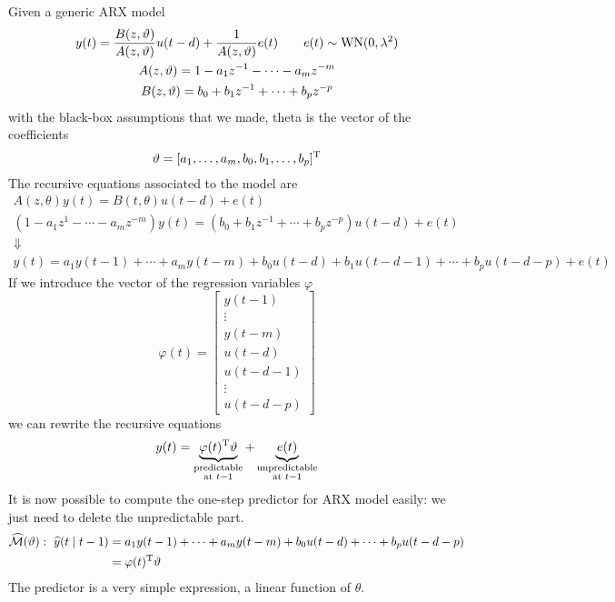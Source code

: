 Given a generic ARX model
\begin{gather*}
y(t) =\frac{B(z,\vartheta)}{A(z,\vartheta)} u(t-d) +\frac{1}{A(z,\vartheta)} e(t) \qquad e(t) \sim \operatorname{WN}(0,\lambda ^{2})\\
A(z,\vartheta) =1-a_{1} z^{-1} -\cdots -a_{m} z^{-m}\\
B(z,\vartheta) =b_{0} +b_{1} z^{-1} +\cdots +b_{p} z^{-p}
\end{gather*}
with the black-box assumptions that we made, theta is the vector of the coefficients
\begin{equation*}
\vartheta = [ a_{1},\ldots,a_{m},b_{0},b_{1},\ldots,b_{p}]^{\mathrm{T}}
\end{equation*}
The recursive equations associated to the model are
\begin{gather*}
A(z,\theta) y(t) =B(t,\theta) u(t-d) +e(t)\\
\left(1-a_{1} z^{1} -\cdots -a_{m} z^{-m}\right) y(t) =\left(b_{0} +b_{1} z^{-1} +\cdots +b_{p} z^{-p}\right) u(t-d) +e(t)\\
\Downarrow \\
y(t) =a_{1} y(t-1) +\cdots +a_{m} y(t-m) +b_{0} u(t-d) +b_{1} u(t-d-1) +\cdots +b_{p} u(t-d-p) +e(t)
\end{gather*}
If we introduce the vector of the regression variables $ \varphi $
\begin{equation*}
\varphi (t) =\begin{bmatrix}
y(t-1)\\
\vdots\\
y(t-m)\\
u(t-d)\\
u(t-d-1)\\
\vdots\\
u(t-d-p)
\end{bmatrix}
\end{equation*}
we can rewrite the recursive equations
\begin{equation*}
	y(t) =\underbrace{\varphi (t)^{\mathrm{T}} \vartheta }_{\substack{\text{predictable}\\\text{at }t-1}} +\underbrace{e(t)}_{\substack{\text{unpredictable}\\\text{at }t-1}}
\end{equation*}
It is now possible to compute the one-step predictor for ARX model easily: we just need to delete the unpredictable part.
\begin{align*}
	\widehat{\mathcal{M}}(\vartheta) :\ \widehat{y}(t\mid t-1) & =a_{1} y(t-1) +\cdots +a_{m} y(t-m) +b_{0} u(t-d) +\cdots +b_{p} u(t-d-p)\\
	& =\varphi (t)^{\mathrm{T}} \vartheta 
\end{align*}
The predictor is a very simple expression, a linear function of $ \theta $.

